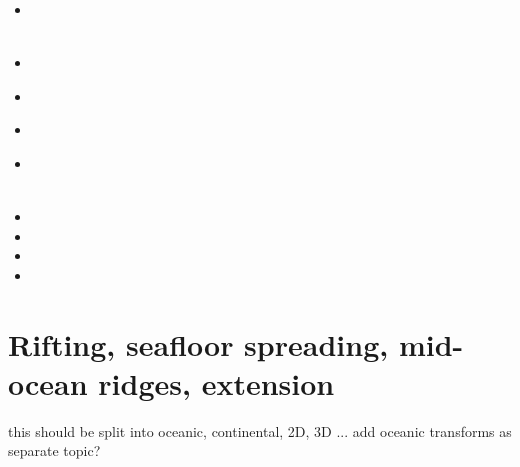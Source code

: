 \begin{small}
\begin{itemize}
\item[\twothousandthirteen] 
 \\
 \\
\item[\twothousandfourteen] 
\item[\twothousandfifteen] 
 \\
\item[\twothousandseventeen] 
\item[\twothousandnineteen] 
 \\
 \\
\item[\twothousandtwenty] 
\item[\twothousandtwentyone] 
\item[\twothousandtwentytwo] 
\item[\twothousandtwentythree] 
\end{itemize}
\end{small}

\section{Rifting, seafloor spreading, mid-ocean ridges, extension}

{\color{red} this should be split into oceanic, continental, 2D, 3D ...}
add oceanic transforms as separate topic?

